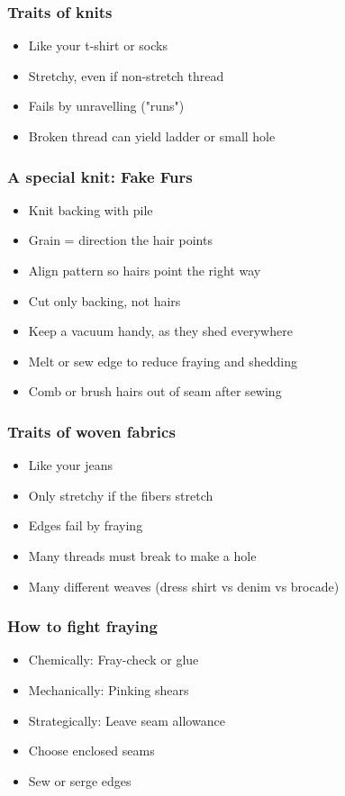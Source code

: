 \documentclass{beamer}
\begin{document}
\begin{frame}[fragile]
\frametitle{Traits of knits}
\begin{itemize}
\item Like your t-shirt or socks
\item Stretchy, even if non-stretch thread
\item Fails by unravelling ("runs")
\item Broken thread can yield ladder or small hole
\end{itemize}
\end{frame}

\begin{frame}[fragile]
\frametitle{A special knit: Fake Furs}
\begin{itemize}
\item Knit backing with pile
\item Grain = direction the hair points
\item Align pattern so hairs point the right way
\item Cut only backing, not hairs
\item Keep a vacuum handy, as they shed everywhere
\item Melt or sew edge to reduce fraying and shedding
\item Comb or brush hairs out of seam after sewing
\end{itemize}
\end{frame}

\begin{frame}[fragile]
\frametitle{Traits of woven fabrics}
\begin{itemize}
\item Like your jeans
\item Only stretchy if the fibers stretch
\item Edges fail by fraying
\item Many threads must break to make a hole
\item Many different weaves (dress shirt vs denim vs brocade)
\end{itemize}
\end{frame}

\begin{frame}[fragile]
\frametitle{How to fight fraying}
\begin{itemize}
\item Chemically: Fray-check or glue
\item Mechanically: Pinking shears
\item Strategically: Leave seam allowance
\item Choose enclosed seams
\item Sew or serge edges
\end{itemize}
\end{frame}
\end{document}
